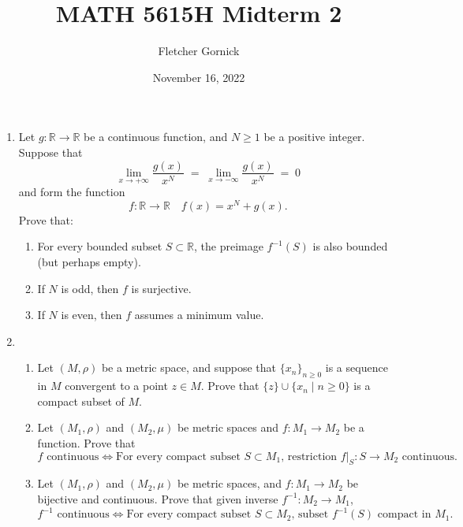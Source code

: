 \documentclass[11pt]{article}
\title{\vspace{-1.0cm}MATH 5615H Midterm 2}
\author{Fletcher Gornick}
\date{November 16, 2022}
\begin{document}
\maketitle
\newpage
\begin{enumerate}
  \item Let \(g \colon \mathbb{R} \to \mathbb{R}\) be a continuous function, and \(N \geq 1\) be a positive 
    integer.  Suppose that
    \[\lim_{x \to +\infty} \frac{g(x)}{x^N} \;=\; \lim_{x \to -\infty} \frac{g(x)}{x^N} \;=\; 0\]
    and form the function
    \[f \colon \mathbb{R} \to \mathbb{R} \quad f(x) = x^N + g(x).\]
    Prove that:
    \begin{enumerate}[label=(\alph*)]
      \item For every bounded subset \(S \subset \mathbb{R}\), the preimage \(f^{-1}(S)\) is also bounded (but 
        perhaps empty).
      \item If \(N\) is odd, then \(f\) is surjective.
      \item If \(N\) is even, then \(f\) assumes a minimum value.
    \end{enumerate}
    \newpage

  \item \begin{enumerate}[label=(\alph*)]
    \item Let \((M,\rho)\) be a metric space, and suppose that \(\{x_n\}_{n \geq 0}\) is a sequence in \(M\) 
    convergent to a point \(z \in M\).  Prove that \(\{z\} \cup \{x_n \mid n \geq 0\}\) is a compact subset of 
    \(M\).
  \item Let \((M_1, \rho)\) and \((M_2, \mu)\) be metric spaces and \(f \colon M_1 \to M_2\) be a function.  
    Prove that 
      \[\text{\(f\) continuous} \iff \text{For every compact subset \(S \subset M_1\), restriction 
      \(f|_S \colon S \to M_2\) continuous.}\]
  \item Let \((M_1, \rho)\) and \((M_2, \mu)\) be metric spaces, and \(f \colon M_1 \to M_2\) be bijective and 
    continuous.  Prove that given inverse \(f^{-1} \colon M_2 \to M_1\),
      \[\text{\(f^{-1}\) continuous} \iff \text{For every compact subset 
      \(S \subset M_2\), subset \(f^{-1}(S)\) compact in \(M_1\).}\]

  \end{enumerate}
\end{enumerate}
\end{document}
